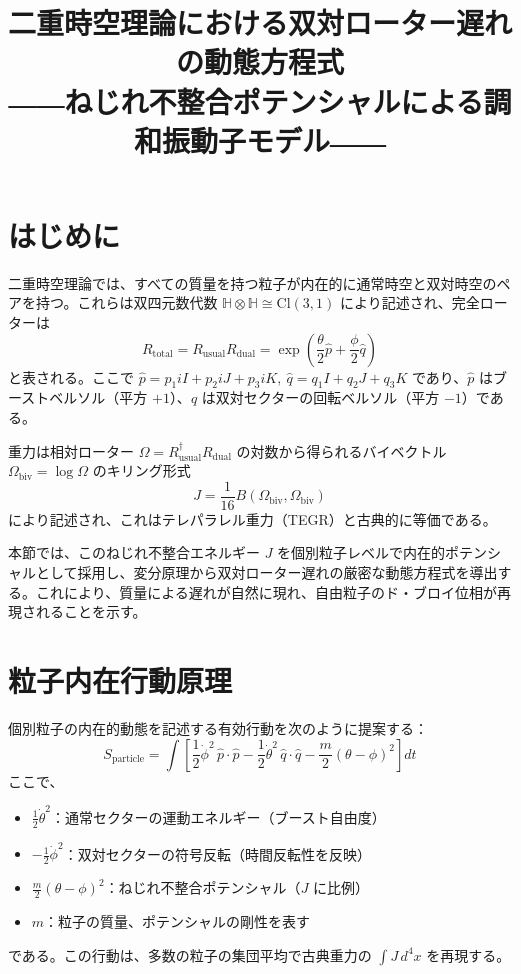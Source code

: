 \documentclass[11pt,a4paper]{article}
\title{二重時空理論における双対ローター遅れの動態方程式\\
――ねじれ不整合ポテンシャルによる調和振動子モデル――}
\author{}
\date{}
\begin{document}
\maketitle

\section{はじめに}

二重時空理論では、すべての質量を持つ粒子が内在的に通常時空と双対時空のペアを持つ。これらは双四元数代数 $\mathbb{H}\otimes\mathbb{H}\cong\mathrm{Cl}(3,1)$ により記述され、完全ローターは
\begin{equation}
R_{\text{total}} = R_{\text{usual}} R_{\text{dual}}
= \exp \left(\frac{\theta}{2} \hat{p} + \frac{\phi}{2}\hat{q}\right)
\end{equation}
と表される。ここで $\hat{p} = p_1 iI + p_2 iJ + p_3 iK, ~ \hat{q} = q_1 I + q_2 J + q_3 K$ であり、$\hat{p}$ はブーストベルソル（平方 $+1$）、$\hat{q}$ は双対セクターの回転ベルソル（平方 $-1$）である。

重力は相対ローター $\Omega = R_{\text{usual}}^\dagger R_{\text{dual}}$ の対数から得られるバイベクトル $\Omega_{\text{biv}}=\log\Omega$ のキリング形式
\begin{equation}
J = \frac{1}{16} B(\Omega_{\text{biv}},\Omega_{\text{biv}})
\end{equation}
により記述され、これはテレパラレル重力（TEGR）と古典的に等価である。

本節では、このねじれ不整合エネルギー $J$ を個別粒子レベルで内在的ポテンシャルとして採用し、変分原理から双対ローター遅れの厳密な動態方程式を導出する。これにより、質量による遅れが自然に現れ、自由粒子のド・ブロイ位相が再現されることを示す。

\section{粒子内在行動原理}

個別粒子の内在的動態を記述する有効行動を次のように提案する：
\begin{equation}
S_{\text{particle}} = \int \left[ 
\frac{1}{2} \dot{\phi}^2 \, \hat{p}\cdot\hat{p}
- \frac{1}{2} \dot{\theta}^2 \, \hat{q}\cdot\hat{q}
- \frac{m}{2} (\theta - \phi)^2 
\right] dt
\end{equation}
ここで、
\begin{itemize}
\item $\frac{1}{2}\dot{\theta}^2$：通常セクターの運動エネルギー（ブースト自由度）
\item $-\frac{1}{2}\dot{\phi}^2$：双対セクターの符号反転（時間反転性を反映）
\item $\frac{m}{2}(\theta - \phi)^2$：ねじれ不整合ポテンシャル（$J$ に比例）
\item $m$：粒子の質量、ポテンシャルの剛性を表す
\end{itemize}
である。この行動は、多数の粒子の集団平均で古典重力の $\int J\,d^4x$ を再現する。
\end{document}
